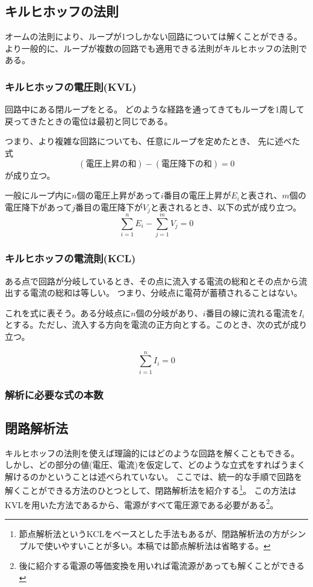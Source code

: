 \documentclass{ltjsreport}
\begin{document}
\subsection{キルヒホッフの法則}
オームの法則により、ループが1つしかない回路については解くことができる。
より一般的に、ループが複数の回路でも適用できる法則がキルヒホッフの法則である。



\subsubsection{キルヒホッフの電圧則(KVL)}
回路中にある閉ループをとる。
どのような経路を通ってきてもループを1周して戻ってきたときの電位は最初と同じである。

つまり、より複雑な回路についても、任意にループを定めたとき、
先に述べた式
\[
  (電圧上昇の和)-(電圧降下の和) =0
\]
が成り立つ。

一般にループ内に$n$個の電圧上昇があって$i$番目の電圧上昇が$E_i$と表され、$m$個の電圧降下があって$j$番目の電圧降下が$V_j$と表されるとき、以下の式が成り立つ。
\begin{equation}
  \sum_{i=1}^{n} E_i - \sum_{j=1}^{m} V_j = 0
\end{equation}



\subsubsection{キルヒホッフの電流則(KCL)}
ある点で回路が分岐しているとき、その点に流入する電流の総和とその点から流出する電流の総和は等しい。
つまり、分岐点に電荷が蓄積されることはない。

これを式に表そう。ある分岐点に$n$個の分岐があり、$i$番目の線に流れる電流を$I_i$とする。ただし、流入する方向を電流の正方向とする。このとき、次の式が成り立つ。

\begin{equation}
  \sum_{i=1}^{n} I_i = 0
\end{equation}


\subsubsection{解析に必要な式の本数}


\subsection{閉路解析法}
キルヒホッフの法則を使えば理論的にはどのような回路を解くこともできる。
しかし、どの部分の値(電圧、電流)を仮定して、どのような立式をすればうまく解けるのかということは述べられていない。
ここでは、統一的な手順で回路を解くことができる方法のひとつとして、閉路解析法を紹介する\footnote{節点解析法というKCLをベースとした手法もあるが、閉路解析法の方がシンプルで使いやすいことが多い。本稿では節点解析法は省略する。}。
この方法はKVLを用いた方法であるから、電源がすべて電圧源である必要がある\footnote{後に紹介する電源の等価変換を用いれば電流源があっても解くことができる}。
\end{document}
